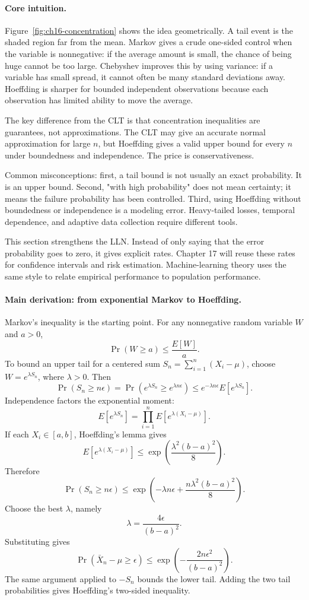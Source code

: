 \paragraph{Core intuition.}
Figure~\ref{fig:ch16-concentration} shows the idea geometrically. A tail event is the shaded region far from the mean. Markov gives a crude one-sided control when the variable is nonnegative: if the average amount is small, the chance of being huge cannot be too large. Chebyshev improves this by using variance: if a variable has small spread, it cannot often be many standard deviations away. Hoeffding is sharper for bounded independent observations because each observation has limited ability to move the average.

The key difference from the CLT is that concentration inequalities are guarantees, not approximations. The CLT may give an accurate normal approximation for large \(n\), but Hoeffding gives a valid upper bound for every \(n\) under boundedness and independence. The price is conservativeness.

Common misconceptions: first, a tail bound is not usually an exact probability. It is an upper bound. Second, "with high probability" does not mean certainty; it means the failure probability has been controlled. Third, using Hoeffding without boundedness or independence is a modeling error. Heavy-tailed losses, temporal dependence, and adaptive data collection require different tools.

This section strengthens the LLN. Instead of only saying that the error probability goes to zero, it gives explicit rates. Chapter 17 will reuse these rates for confidence intervals and risk estimation. Machine-learning theory uses the same style to relate empirical performance to population performance.

\paragraph{Main derivation: from exponential Markov to Hoeffding.}
Markov's inequality is the starting point. For any nonnegative random variable \(W\) and \(a>0\),
\[
\Pr(W\geq a)\leq\frac{E[W]}{a}.
\]
To bound an upper tail for a centered sum \(S_n=\sum_{i=1}^n(X_i-\mu)\), choose \(W=e^{\lambda S_n}\), where \(\lambda>0\). Then
\[
\Pr(S_n\geq n\epsilon)
=\Pr(e^{\lambda S_n}\geq e^{\lambda n\epsilon})
\leq e^{-\lambda n\epsilon}E[e^{\lambda S_n}].
\]
Independence factors the exponential moment:
\[
E[e^{\lambda S_n}]
=\prod_{i=1}^n E[e^{\lambda(X_i-\mu)}].
\]
If each \(X_i\in[a,b]\), Hoeffding's lemma gives
\[
E[e^{\lambda(X_i-\mu)}]\leq
\exp\!\left(\frac{\lambda^2(b-a)^2}{8}\right).
\]
Therefore
\[
\Pr(S_n\geq n\epsilon)
\leq
\exp\!\left(-\lambda n\epsilon+\frac{n\lambda^2(b-a)^2}{8}\right).
\]
Choose the best \(\lambda\), namely
\[
\lambda=\frac{4\epsilon}{(b-a)^2}.
\]
Substituting gives
\[
\Pr(\bar X_n-\mu\geq\epsilon)
\leq
\exp\!\left(-\frac{2n\epsilon^2}{(b-a)^2}\right).
\]
The same argument applied to \(-S_n\) bounds the lower tail. Adding the two tail probabilities gives Hoeffding's two-sided inequality.

